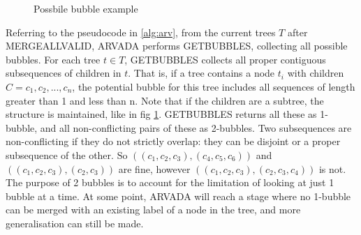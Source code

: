 \begin{figure}[H]
\centering
{}


\caption{Possbile bubble example}
\label{fig: possible bubble}
\end{figure}

Referring to the pseudocode in \ref{alg:arv}, from the current trees $T$ after MERGEALLVALID, ARVADA performs GETBUBBLES, collecting all possible bubbles. For each tree $t \in T$, GETBUBBLES collects all proper contiguous subsequences of children in $t$. That is, if a tree contains a node $t_i$ with children $C = c_1, c_2,..., c_n$, the potential bubble for this tree includes all sequences of length greater than 1 and less than n. Note that if the children are a subtree, the structure is maintained, like in fig \ref{fig: possible bubble}. GETBUBBLES returns all these as 1-bubble, and all non-conflicting pairs of these as 2-bubbles. Two subsequences are non-conflicting if they do not strictly overlap: they can be disjoint or a proper subsequence of the other. So $((c_1, c_2, c_3), (c_4, c_5, c_6))$ and $((c_1, c_2, c_3), (c_2, c_3))$ are fine, however $((c_1, c_2, c_3), (c_2, c_3, c_4))$ is not. The purpose of 2 bubbles is to account for the limitation of looking at just 1 bubble at a time. At some point, ARVADA will reach a stage where no 1-bubble can be merged with an existing label of a node in the tree, and more generalisation can still be made.
\vspace{\baselineskip}


